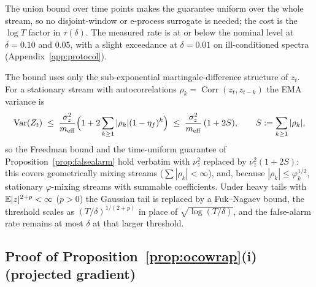 \begin{remark}
The union bound over time points makes the guarantee uniform over the whole stream, so no disjoint-window or e-process surrogate is needed; the cost is the $\log T$ factor in $\tau(\delta)$.
The measured rate is at or below the nominal level at $\delta = 0.10$ and $0.05$, with a slight exceedance at $\delta = 0.01$ on ill-conditioned spectra (Appendix~\ref{app:protocol}).
\end{remark}

\begin{remark}
\label{rem:mixing}
The bound uses only the sub-exponential martingale-difference structure of $z_t$. For a stationary stream with autocorrelations $\rho_k = \operatorname{Corr}(z_t,z_{t-k})$ the EMA variance is
\[
\operatorname{Var}(Z_t) \;\le\; \frac{\sigma_z^2}{m_{\mathrm{eff}}}\Bigl(1 + 2\sum_{k\ge1}|\rho_k|(1-\eta_f)^k\Bigr) \;\le\; \frac{\sigma_z^2}{m_{\mathrm{eff}}}\,(1 + 2S),
\qquad S := \sum_{k\ge1}|\rho_k|,
\]
so the Freedman bound and the time-uniform guarantee of Proposition~\ref{prop:falsealarm} hold verbatim with $\nu_z^2$ replaced by $\nu_z^2(1+2S)$: this covers geometrically mixing streams ($\sum|\rho_k|<\infty$), and, because $|\rho_k|\le\varphi_k^{1/2}$, stationary $\varphi$-mixing streams with summable coefficients. Under heavy tails with $\mathbb{E}|z|^{2+p}<\infty$ ($p>0$) the Gaussian tail is replaced by a Fuk--Nagaev bound, the threshold scales as $(T/\delta)^{1/(2+p)}$ in place of $\sqrt{\log(T/\delta)}$, and the false-alarm rate remains at most $\delta$ at that larger threshold.
\end{remark}

\subsection{Proof of Proposition~\ref{prop:ocowrap}(i) (projected gradient)}
\label{app:proof-composition}

